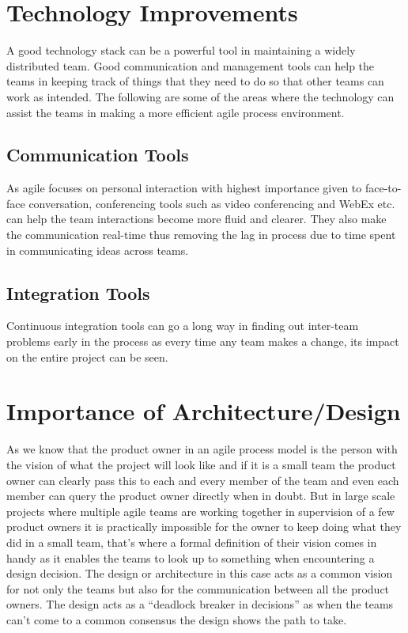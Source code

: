 \section{Technology Improvements} 
\label{sec:tech_impv}
	A good technology stack can be a powerful tool in maintaining a widely distributed team. Good communication and management tools can help the teams in keeping track of things that they need to do so that other teams can work as intended. The following are some of the areas where the technology can assist the teams in making a more efficient agile process environment.

\subsection{Communication Tools} As agile focuses on personal interaction with highest importance given to face-to-face conversation, conferencing tools such as video conferencing and WebEx etc. can help the team interactions become more fluid and clearer. They also make the communication real-time thus removing the lag in process due to time spent in communicating ideas across teams.

\subsection{Integration Tools} Continuous integration tools can go a long way in finding out inter-team problems early in the process as every time any team makes a change, its impact on the entire project can be seen.

\section{Importance of Architecture/Design}
\label{sec:imp_of_dsgn}
As we know that the product owner in an agile process model is the person with the vision of what the project will look like and if it is a small team the product owner can clearly pass this to each and every member of the team and even each member can query the product owner directly when in doubt. But in large scale projects where multiple agile teams are working together in supervision of a few product owners it is practically impossible for the owner to keep doing what they did in a small team, that’s where a formal definition of their vision comes in handy as it enables the teams to look up to something when encountering a design decision. The design or architecture in this case acts as a common vision for not only the teams but also for the communication between all the product owners. The design acts as a “deadlock breaker in decisions” \cite{architecureRole_article} as when the teams can’t come to a common consensus the design shows the path to take.
